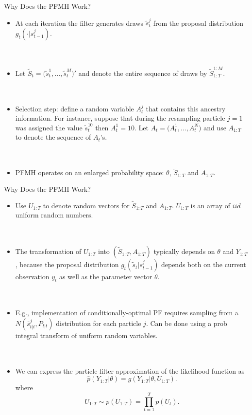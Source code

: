 \documentclass[presentation]{beamer}
\begin{document}
\begin{frame}[label={sec:orga320eec}]{Why Does the PFMH Work?}
\begin{itemize}
\item At each iteration the filter generates draws \(\tilde{s}_t^j\) from the proposal distribution \(g_t(\cdot|s_{t-1}^j)\).
\\~\\~
\item Let \(\tilde{S}_t = \big( \tilde{s}_t^1,\ldots,\tilde{s}_t^M \big)'\) and denote the entire sequence of draws by \(\tilde{S}_{1:T}^{1:M}\).
\\~\\~
\item Selection step: define a random variable \(A_t^j\) that contains this ancestry information.  For instance, suppose that during the resampling particle \(j=1\) was assigned the value \(\tilde{s}_t^{10}\) then \(A_t^1=10\). Let \(A_t = \big( A_t^1, \ldots, A_t^N \big)\) and use \(A_{1:T}\) to denote the sequence of \(A_t\)'s.
\\~\\~
\item PFMH operates on an enlarged probability space: \(\theta\), \(\tilde{S}_{1:T}\) and \(A_{1:T}\).
\end{itemize}
\end{frame}

\begin{frame}[label={sec:org025c825}]{Why Does the PFMH Work?}
\begin{itemize}
\item Use \(U_{1:T}\) to denote random vectors for \(\tilde{S}_{1:T}\) and \(A_{1:T}\). \(U_{1:T}\) is an array of \(iid\) uniform random numbers.
\\~\\~
\item The transformation of \(U_{1:T}\) into \((\tilde{S}_{1:T},A_{1:T})\) typically depends on \(\theta\) and \(Y_{1:T}\), because the proposal distribution \(g_t(\tilde{s}_t|s_{t-1}^j)\) depends both on the current observation \(y_t\) as well as the parameter vector \(\theta\).
\\~\\~
\item E.g., implementation of conditionally-optimal PF  requires sampling from a \(N(\bar{s}_{t|t}^j,P_{t|t})\) distribution for each particle \(j\). Can be done using a prob integral transform of uniform random variables.
\\~\\~
\item We can express the particle filter approximation of the likelihood function as
\[
	\hat{p}(Y_{1:T}|\theta) = g(Y_{1:T}|\theta,U_{1:T}).
	\]
where
\[
	U_{1:T} \sim p(U_{1:T}) = \prod_{t=1}^T p(U_t).
	\]
\end{itemize}
\end{frame}
\end{document}
